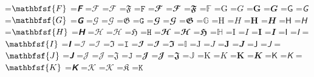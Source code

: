 \documentclass{article}
\begin{document}
=\hbox{$\mathbfsf{F}$}
=\hbox{$\mathbfsfit{F}$}
=\hbox{$\mathcal{F}$}
=\hbox{$\mathscr{F}$}
=\hbox{$\mathfrak{F}$}
=\hbox{$\mathtt{F}$}
=\hbox{$\mathbfcal{F}$}
=\hbox{$\mathbfscr{F}$}
=\hbox{$\mathbffrak{F}$}
=\hbox{$\mathbb{F}$}
=\hbox{$\mathrm{G}$}
=\hbox{$\mathit{G}$}
=\hbox{$\mathbf{G}$}
=\hbox{$\mathbfit{G}$}
=\hbox{$\mathsf{G}$}
=\hbox{$\mathsfit{G}$}
=\hbox{$\mathbfsf{G}$}
=\hbox{$\mathbfsfit{G}$}
=\hbox{$\mathcal{G}$}
=\hbox{$\mathscr{G}$}
=\hbox{$\mathfrak{G}$}
=\hbox{$\mathtt{G}$}
=\hbox{$\mathbfcal{G}$}
=\hbox{$\mathbfscr{G}$}
=\hbox{$\mathbffrak{G}$}
=\hbox{$\mathbb{G}$}
=\hbox{$\mathrm{H}$}
=\hbox{$\mathit{H}$}
=\hbox{$\mathbf{H}$}
=\hbox{$\mathbfit{H}$}
=\hbox{$\mathsf{H}$}
=\hbox{$\mathsfit{H}$}
=\hbox{$\mathbfsf{H}$}
=\hbox{$\mathbfsfit{H}$}
=\hbox{$\mathcal{H}$}
=\hbox{$\mathscr{H}$}
=\hbox{$\mathfrak{H}$}
=\hbox{$\mathtt{H}$}
=\hbox{$\mathbfcal{H}$}
=\hbox{$\mathbfscr{H}$}
=\hbox{$\mathbffrak{H}$}
=\hbox{$\mathbb{H}$}
=\hbox{$\mathrm{I}$}
=\hbox{$\mathit{I}$}
=\hbox{$\mathbf{I}$}
=\hbox{$\mathbfit{I}$}
=\hbox{$\mathsf{I}$}
=\hbox{$\mathsfit{I}$}
=\hbox{$\mathbfsf{I}$}
=\hbox{$\mathbfsfit{I}$}
=\hbox{$\mathcal{I}$}
=\hbox{$\mathscr{I}$}
=\hbox{$\mathfrak{I}$}
=\hbox{$\mathtt{I}$}
=\hbox{$\mathbfcal{I}$}
=\hbox{$\mathbfscr{I}$}
=\hbox{$\mathbffrak{I}$}
=\hbox{$\mathbb{I}$}
=\hbox{$\mathrm{J}$}
=\hbox{$\mathit{J}$}
=\hbox{$\mathbf{J}$}
=\hbox{$\mathbfit{J}$}
=\hbox{$\mathsf{J}$}
=\hbox{$\mathsfit{J}$}
=\hbox{$\mathbfsf{J}$}
=\hbox{$\mathbfsfit{J}$}
=\hbox{$\mathcal{J}$}
=\hbox{$\mathscr{J}$}
=\hbox{$\mathfrak{J}$}
=\hbox{$\mathtt{J}$}
=\hbox{$\mathbfcal{J}$}
=\hbox{$\mathbfscr{J}$}
=\hbox{$\mathbffrak{J}$}
=\hbox{$\mathbb{J}$}
=\hbox{$\mathrm{K}$}
=\hbox{$\mathit{K}$}
=\hbox{$\mathbf{K}$}
=\hbox{$\mathbfit{K}$}
=\hbox{$\mathsf{K}$}
=\hbox{$\mathsfit{K}$}
=\hbox{$\mathbfsf{K}$}
=\hbox{$\mathbfsfit{K}$}
=\hbox{$\mathcal{K}$}
=\hbox{$\mathscr{K}$}
=\hbox{$\mathfrak{K}$}
=\hbox{$\mathtt{K}$}
\end{document}

